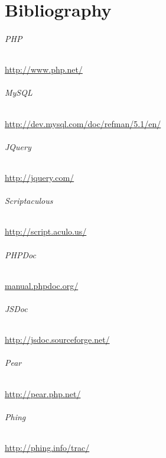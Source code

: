 \chapter*{Bibliography}

\subparagraph*{PHP}
\url{http://www.php.net/}

\subparagraph*{MySQL}
\url{http://dev.mysql.com/doc/refman/5.1/en/}

\subparagraph*{JQuery}
\url{http://jquery.com/}

\subparagraph*{Scriptaculous}
\url{http://script.aculo.us/}

\subparagraph*{PHPDoc}
\url{manual.phpdoc.org/ }

\subparagraph*{JSDoc}
\url{http://jsdoc.sourceforge.net/}

\subparagraph*{Pear}
\url{http://pear.php.net/}

\subparagraph*{Phing}
\url{http://phing.info/trac/}